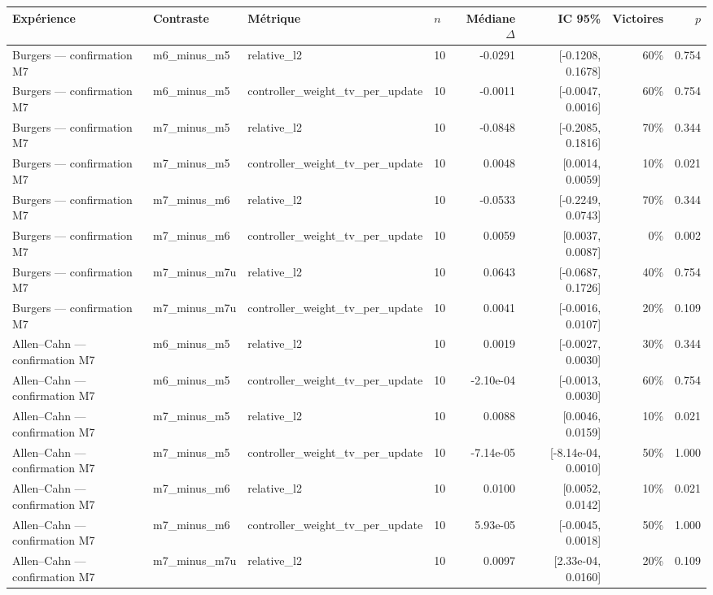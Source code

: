 \begin{tabular}{llllrrrr}
\toprule
Expérience & Contraste & Métrique & $n$ & Médiane $\Delta$ & IC 95\% & Victoires & $p$ \\
\midrule
Burgers — confirmation M7 & m6\_minus\_m5 & relative\_l2 & 10 & -0.0291 & [-0.1208, 0.1678] & 60\% & 0.754 \\
Burgers — confirmation M7 & m6\_minus\_m5 & controller\_weight\_tv\_per\_update & 10 & -0.0011 & [-0.0047, 0.0016] & 60\% & 0.754 \\
Burgers — confirmation M7 & m7\_minus\_m5 & relative\_l2 & 10 & -0.0848 & [-0.2085, 0.1816] & 70\% & 0.344 \\
Burgers — confirmation M7 & m7\_minus\_m5 & controller\_weight\_tv\_per\_update & 10 & 0.0048 & [0.0014, 0.0059] & 10\% & 0.021 \\
Burgers — confirmation M7 & m7\_minus\_m6 & relative\_l2 & 10 & -0.0533 & [-0.2249, 0.0743] & 70\% & 0.344 \\
Burgers — confirmation M7 & m7\_minus\_m6 & controller\_weight\_tv\_per\_update & 10 & 0.0059 & [0.0037, 0.0087] & 0\% & 0.002 \\
Burgers — confirmation M7 & m7\_minus\_m7u & relative\_l2 & 10 & 0.0643 & [-0.0687, 0.1726] & 40\% & 0.754 \\
Burgers — confirmation M7 & m7\_minus\_m7u & controller\_weight\_tv\_per\_update & 10 & 0.0041 & [-0.0016, 0.0107] & 20\% & 0.109 \\
Allen–Cahn — confirmation M7 & m6\_minus\_m5 & relative\_l2 & 10 & 0.0019 & [-0.0027, 0.0030] & 30\% & 0.344 \\
Allen–Cahn — confirmation M7 & m6\_minus\_m5 & controller\_weight\_tv\_per\_update & 10 & -2.10e-04 & [-0.0013, 0.0030] & 60\% & 0.754 \\
Allen–Cahn — confirmation M7 & m7\_minus\_m5 & relative\_l2 & 10 & 0.0088 & [0.0046, 0.0159] & 10\% & 0.021 \\
Allen–Cahn — confirmation M7 & m7\_minus\_m5 & controller\_weight\_tv\_per\_update & 10 & -7.14e-05 & [-8.14e-04, 0.0010] & 50\% & 1.000 \\
Allen–Cahn — confirmation M7 & m7\_minus\_m6 & relative\_l2 & 10 & 0.0100 & [0.0052, 0.0142] & 10\% & 0.021 \\
Allen–Cahn — confirmation M7 & m7\_minus\_m6 & controller\_weight\_tv\_per\_update & 10 & 5.93e-05 & [-0.0045, 0.0018] & 50\% & 1.000 \\
Allen–Cahn — confirmation M7 & m7\_minus\_m7u & relative\_l2 & 10 & 0.0097 & [2.33e-04, 0.0160] & 20\% & 0.109 \\

\end{tabular}
